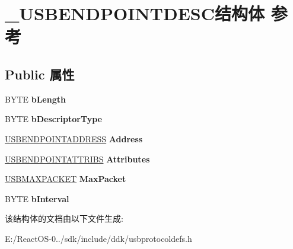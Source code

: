 \hypertarget{struct___u_s_b_e_n_d_p_o_i_n_t_d_e_s_c}{}\section{\+\_\+\+U\+S\+B\+E\+N\+D\+P\+O\+I\+N\+T\+D\+E\+S\+C结构体 参考}
\label{struct___u_s_b_e_n_d_p_o_i_n_t_d_e_s_c}
\subsection*{Public 属性}
\begin{DoxyCompactItemize}
\item 
\mbox{\label{struct___u_s_b_e_n_d_p_o_i_n_t_d_e_s_c_aa37c1e1f056f1f6958e193342957ca82}} 
B\+Y\+TE {\bfseries b\+Length}
\item 
\mbox{\label{struct___u_s_b_e_n_d_p_o_i_n_t_d_e_s_c_a0275d1270b543f2e05324c33a2db194d}} 
B\+Y\+TE {\bfseries b\+Descriptor\+Type}
\item 
\mbox{\label{struct___u_s_b_e_n_d_p_o_i_n_t_d_e_s_c_a0b2e279feedf832061e7244a14e6ef10}} 
\hyperlink{union___u_s_b_e_n_d_p_o_i_n_t_a_d_d_r_e_s_s}{U\+S\+B\+E\+N\+D\+P\+O\+I\+N\+T\+A\+D\+D\+R\+E\+SS} {\bfseries Address}
\item 
\mbox{\label{struct___u_s_b_e_n_d_p_o_i_n_t_d_e_s_c_a733c50f869466200f57981d76e389d7c}} 
\hyperlink{union___u_s_b_e_n_d_p_o_i_n_t_a_t_t_r_i_b_s}{U\+S\+B\+E\+N\+D\+P\+O\+I\+N\+T\+A\+T\+T\+R\+I\+BS} {\bfseries Attributes}
\item 
\mbox{\label{struct___u_s_b_e_n_d_p_o_i_n_t_d_e_s_c_afef07578885fb4d1e11d5201b3ee70d1}} 
\hyperlink{union___u_s_b_m_a_x_p_a_c_k_e_t}{U\+S\+B\+M\+A\+X\+P\+A\+C\+K\+ET} {\bfseries Max\+Packet}
\item 
\mbox{\label{struct___u_s_b_e_n_d_p_o_i_n_t_d_e_s_c_ac3ac954f40e5f20e5e3a5cd250bc9efc}} 
B\+Y\+TE {\bfseries b\+Interval}
\end{DoxyCompactItemize}


该结构体的文档由以下文件生成\+:\begin{DoxyCompactItemize}
\item 
E\+:/\+React\+O\+S-\/0../sdk/include/ddk/usbprotocoldefs.\+h\end{DoxyCompactItemize}
